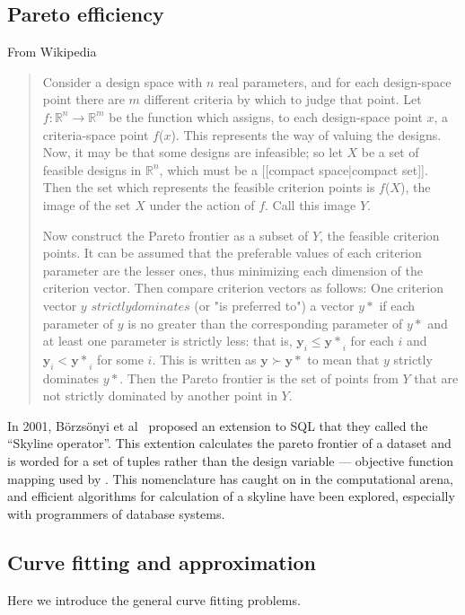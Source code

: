 \subsection{Pareto efficiency}
From Wikipedia
\begin{quote}
  Consider a design space with $n$ real parameters, and for each design-space point there are $m$ different criteria by which to judge that point.
  Let $f : \mathbb{R}^n \rightarrow \mathbb{R}^m$ be the function which assigns, to each design-space point $x$, a criteria-space point $f$($x$).
  This represents the way of valuing the designs.
  Now, it may be that some designs are infeasible; so let $X$ be a set of feasible designs in ${\mathbb{R}}^n$, which must be a [[compact space|compact set]].
  Then the set which represents the feasible criterion points is $f$($X$), the image of the set $X$ under the action of $f$.
  Call this image $Y$.

  Now construct the Pareto frontier as a subset of $Y$, the feasible criterion points.
  It can be assumed that the preferable values of each criterion parameter are the lesser ones, thus minimizing each dimension of the criterion vector. Then compare criterion vectors as follows:
  One criterion vector $y$ $strictly dominates$ (or "is preferred to") a vector $y*$ if each parameter of $y$ is no greater than the corresponding parameter of $y*$ and at least one parameter is strictly less: that is, $\mathbf{y}_i \le \mathbf{y*}_i$ for each $i$ and $\mathbf{y}_i < \mathbf{y*}_i$ for some $i$.
This is written as $\mathbf{y} \succ \mathbf{y*}$ to mean that $y$ strictly dominates $y*$.
Then the Pareto frontier is the set of points from $Y$ that are not strictly dominated by another point in $Y$.
\end{quote}

In 2001, B\"orzs\"onyi et al \citehere\ proposed an extension to SQL that they called the ``Skyline operator''.
This extention calculates the pareto frontier of a dataset and is worded for a set of tuples rather than the design variable --- objective function mapping used by \citet{deb.kalyanmoy2001multi-objective}.
This nomenclature has caught on in the computational arena, and efficient algorithms for calculation of a skyline have been explored, especially with
programmers of database systems.

\subsection{Curve fitting and approximation}
Here we introduce the general curve fitting problems.

